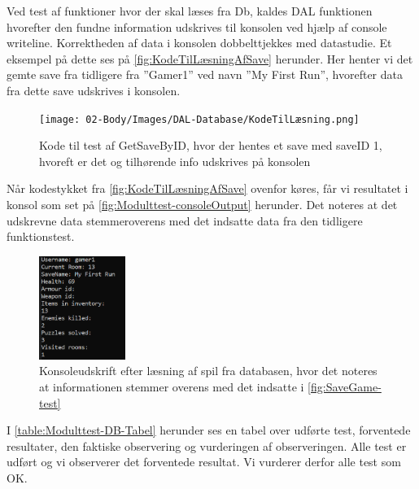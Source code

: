 Ved test af funktioner hvor der skal læses fra Db, kaldes DAL funktionen hvorefter den fundne information udskrives til konsolen ved hjælp af console writeline. Korrektheden af data i konsolen dobbelttjekkes med datastudie.
Et eksempel på dette ses på \autoref{fig:KodeTilLæsningAfSave} herunder.
Her henter vi det gemte save fra tidligere fra ”Gamer1” ved navn ”My First Run”, hvorefter data fra dette save udskrives i konsolen.

\begin{figure}[H]
\centering
\texttt{[image: 02-Body/Images/DAL-Database/KodeTilLæsning.png]}
\caption{Kode til test af GetSaveByID, hvor der hentes et save med saveID 1, hvoreft er det og tilhørende info udskrives på konsolen}
\label{fig:KodeTilLæsningAfSave}
\end{figure}

Når kodestykket fra \autoref{fig:KodeTilLæsningAfSave} ovenfor køres, får vi resultatet i konsol som set på \autoref{fig:Modulttest-consoleOutput} herunder.
Det noteres at det udskrevne data stemmeroverens med det indsatte data fra den tidligere funktionstest.

\begin{figure}[H]
\centering
\includegraphics[width = 0.25\textwidth]{02-Body/Images/DAL-Database/ConsoleOutput.png}
\caption{Konsoleudskrift efter læsning af spil fra databasen, hvor det noteres at informationen stemmer overens med det indsatte i \autoref{fig:SaveGame-test}}
\label{fig:Modulttest-consoleOutput}
\end{figure}


I \autoref{table:Modulttest-DB-Tabel} herunder ses en tabel over udførte test, forventede resultater, den faktiske observering og vurderingen af observeringen.
Alle test er udført og vi observerer det forventede resultat. Vi vurderer derfor alle test som OK.

